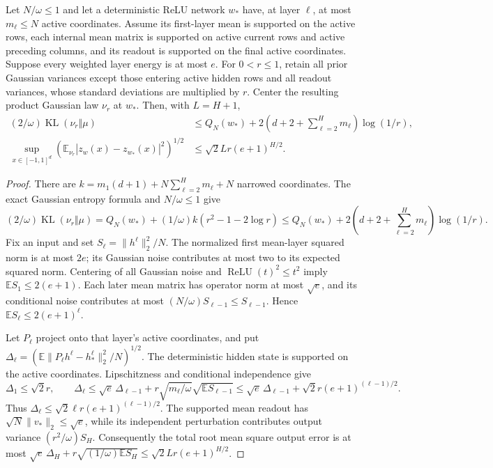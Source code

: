 \begin{lemma}
\label{ag-lem:relu-profile-comparison}
Let $N/\omega\le1$ and let a deterministic ReLU network $w_*$
have, at layer $\ell$, at most $m_\ell\le N$ active coordinates.
Assume its first-layer mean is supported on the active rows, each
internal mean matrix is supported on active current rows and active
preceding columns, and its readout is supported on the final active
coordinates. Suppose every weighted layer energy is at most $e$.
For $0<r\le1$, retain all prior Gaussian variances except those
entering active hidden rows and all readout variances, whose standard
deviations are multiplied by $r$. Center the resulting product Gaussian
law $\nu_r$ at $w_*$. Then, with $L=H+1$,
\begin{align*}
 (2/\omega)\operatorname{KL}(\nu_r\Vert\mu)
 &\le Q_N(w_*)+2\left(d+2+\sum_{\ell=2}^Hm_\ell\right)\log(1/r),\\
 \sup_{x\in[-1,1]^d}
 \left(\mathbb E_{\nu_r}|z_w(x)-z_{w_*}(x)|^2\right)^{1/2}
 &\le\sqrt2 Lr(e+1)^{H/2}.
\end{align*}
\end{lemma}
\begin{proof}
There are
$k=m_1(d+1)+N\sum_{\ell=2}^Hm_\ell+N$ narrowed coordinates.
The exact Gaussian entropy formula and $N/\omega\le1$ give
\[
 (2/\omega)\operatorname{KL}(\nu_r\Vert\mu)
 =Q_N(w_*)+(1/\omega)k(r^2-1-2\log r)
 \le Q_N(w_*)+2\left(d+2+\sum_{\ell=2}^Hm_\ell\right)\log(1/r).
\]
Fix an input and set $S_\ell=\|h^\ell\|_2^2/N$. The normalized
first mean-layer squared norm is at most $2e$; its Gaussian noise
contributes at most two to its expected squared norm. Centering of
all Gaussian noise and $\operatorname{ReLU}(t)^2\le t^2$ imply
$\mathbb E S_1\le2(e+1)$. Each later mean matrix has operator norm
at most $\sqrt e$, and its conditional noise contributes at most
$(N/\omega)S_{\ell-1}\le S_{\ell-1}$. Hence
$\mathbb E S_\ell\le2(e+1)^\ell$.

Let $P_\ell$ project onto that layer's active coordinates, and put
$\Delta_\ell=(\mathbb E\|P_\ell h^\ell-h_*^\ell\|_2^2/N)^{1/2}$.
The deterministic hidden state is supported on the active coordinates.
Lipschitzness and conditional independence give
\[
 \Delta_1\le\sqrt2r,\qquad
 \Delta_\ell\le\sqrt e\,\Delta_{\ell-1}
       +r\sqrt{m_\ell/\omega}\sqrt{\mathbb E S_{\ell-1}}
 \le\sqrt e\,\Delta_{\ell-1}
       +\sqrt2r(e+1)^{(\ell-1)/2}.
\]
Thus $\Delta_\ell\le\sqrt2\ell r(e+1)^{(\ell-1)/2}$.
The supported mean readout has $\sqrt N\|v_*\|_2\le\sqrt e$,
while its independent perturbation contributes output variance
$(r^2/\omega)S_H$. Consequently the total root mean square output
error is at most
$\sqrt e\,\Delta_H+r\sqrt{(1/\omega)\mathbb E S_H}
\le\sqrt2 Lr(e+1)^{H/2}$.
\end{proof}

